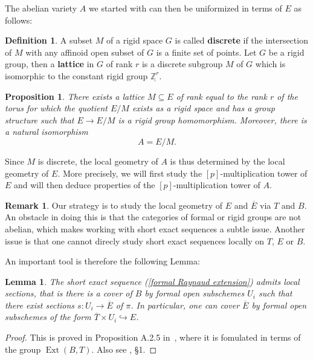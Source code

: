 \documentclass[10pt,oneside]{amsart}
\newtheorem{lemma}[theorem]{Lemma}
\newtheorem{proposition}[theorem]{Proposition}
\theoremstyle{definition}
\newtheorem{definition}[theorem]{Definition}
\newtheorem{remark}[theorem]{Remark}
\begin{document}
	The abelian variety $A$ we started with can then be uniformized in terms of $E$ as follows:
	
	\begin{definition}
		A subset $M$ of a rigid space $G$ is called \textbf{discrete} if the intersection of $M$ with any affinoid open subset of $G$ is a finite set of points.
		Let $G$ be a rigid group, then a \textbf{lattice} in $G$ of rank $r$ is a discrete subgroup $M$ of $G$ which is isomorphic to the constant rigid group $\underline{\mathbb Z^r}$. 
	\end{definition}
	
	\begin{proposition}\label{Raynaud uniformisation}
		There exists a lattice $M \subseteq E$ of rank equal to the rank $r$ of the torus for which the quotient $E/M$ exists as a rigid space and has a group structure such that $E\rightarrow E/M$ is a rigid group homomorphism. Moreover, there is a natural isomorphism
		\[A=E/M.\]
	\end{proposition}
	
	Since $M$ is discrete, the local geometry of $A$ is thus determined by the local geometry of $E$. More precisely, we will first study the $[p]$-multiplication tower of $E$ and will then deduce properties of the $[p]$-multiplication tower of $A$.
	\begin{remark}
	 Our strategy is to study the local geometry of $E$ and $\overline{E}$ via $T$ and $B$. An obstacle in doing this is that the categories of formal or rigid groups are not abelian, which makes working with short exact sequences a subtle issue. Another issue is that one cannot direcly study short exact sequences locally on $T$, $E$ or $B$. 
	\end{remark}
	An important tool is therefore the following Lemma:

	\begin{lemma}\label{formal Raynaud sequence is locally split}
		The short exact sequence (\ref{formal Raynaud extension}) admits local sections, that is there is a cover of $B$ by formal open subschemes $U_i$ such that there exist sections $s:U_i\rightarrow \overline{E}$ of $\pi$. In particular, one can cover $\overline{E}$ by formal open subschemes of the form $\overline{T}\times U_i\hookrightarrow E$.
	\end{lemma}
	\begin{proof}
		This is proved in Proposition A.2.5 in~\cite{rigid geometry of curves}, where it is fomulated in terms of the group $\operatorname{Ext}(B,T)$. Also see \cite{BL}, \S 1.
	\end{proof}
	
\end{document}

